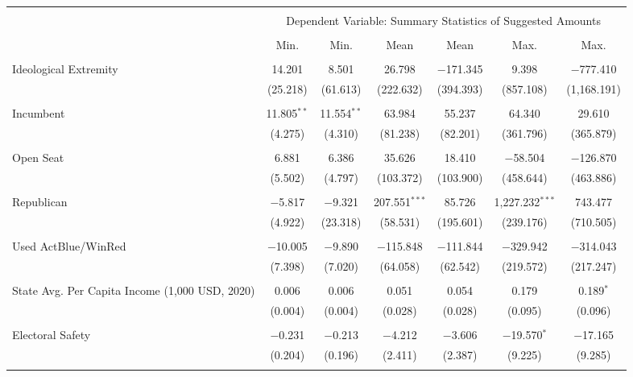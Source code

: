 
\begin{tabular}{@{\extracolsep{5pt}}lcccccc} 
\\[-1.8ex]\hline 
\hline \\[-1.8ex] 
 & \multicolumn{6}{c}{Dependent Variable: Summary Statistics of Suggested Amounts} \\ 
\cline{2-7} 
\\[-1.8ex] & Min. & Min. & Mean & Mean & Max. & Max. \\ 
\hline \\[-1.8ex] 
 Ideological Extremity & 14.201 & 8.501 & 26.798 & $-$171.345 & 9.398 & $-$777.410 \\ 
  & (25.218) & (61.613) & (222.632) & (394.393) & (857.108) & (1,168.191) \\ 
  & & & & & & \\ 
 Incumbent & 11.805$^{**}$ & 11.554$^{**}$ & 63.984 & 55.237 & 64.340 & 29.610 \\ 
  & (4.275) & (4.310) & (81.238) & (82.201) & (361.796) & (365.879) \\ 
  & & & & & & \\ 
 Open Seat & 6.881 & 6.386 & 35.626 & 18.410 & $-$58.504 & $-$126.870 \\ 
  & (5.502) & (4.797) & (103.372) & (103.900) & (458.644) & (463.886) \\ 
  & & & & & & \\ 
 Republican & $-$5.817 & $-$9.321 & 207.551$^{***}$ & 85.726 & 1,227.232$^{***}$ & 743.477 \\ 
  & (4.922) & (23.318) & (58.531) & (195.601) & (239.176) & (710.505) \\ 
  & & & & & & \\ 
 Used ActBlue/WinRed & $-$10.005 & $-$9.890 & $-$115.848 & $-$111.844 & $-$329.942 & $-$314.043 \\ 
  & (7.398) & (7.020) & (64.058) & (62.542) & (219.572) & (217.247) \\ 
  & & & & & & \\ 
 State Avg. Per Capita Income (1,000 USD, 2020) & 0.006 & 0.006 & 0.051 & 0.054 & 0.179 & 0.189$^{*}$ \\ 
  & (0.004) & (0.004) & (0.028) & (0.028) & (0.095) & (0.096) \\ 
  & & & & & & \\ 
 Electoral Safety & $-$0.231 & $-$0.213 & $-$4.212 & $-$3.606 & $-$19.570$^{*}$ & $-$17.165 \\ 
  & (0.204) & (0.196) & (2.411) & (2.387) & (9.225) & (9.285) \\ 
  & & & & & & \\ 

\end{tabular}
